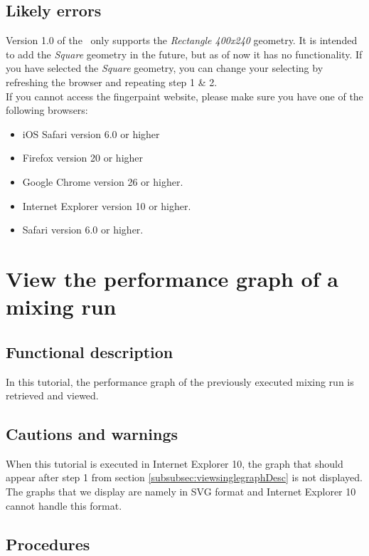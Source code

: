 \subsection{Likely errors}
Version 1.0 of the \applicationname\ only supports the \emph{Rectangle 400x240} geometry. It is intended to add the \emph{Square} geometry in the future, but as of now it has no functionality. If you have selected the \emph{Square} geometry, you can change your selecting by refreshing the browser and repeating step 1 \& 2.\\

\noindent If you cannot access the fingerpaint website, please make sure you have one of the following browsers:\\
\begin{itemize}
\item iOS Safari version 6.0 or higher
\item Firefox version 20 or higher
\item Google Chrome version 26 or higher.
\item Internet Explorer version 10 or higher.
\item Safari version 6.0 or higher.
\end{itemize}

\section{View the performance graph of a mixing run}\label{sec:viewsinglegraph}

\subsection{Functional description}
In this tutorial, the performance graph of the previously executed mixing run is retrieved and viewed.

\subsection{Cautions and warnings}
When this tutorial is executed in Internet Explorer 10, the graph that should appear after step 1 from section  \ref{subsubsec:viewsinglegraphDesc} is not displayed. The graphs that we display are namely in SVG format and Internet Explorer 10 cannot handle this format.

\subsection{Procedures}

